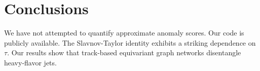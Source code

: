 \section{Conclusions}\label{sec:conclusions}

We have not attempted to quantify approximate anomaly scores. Our code
is publicly available. The Slavnov-Taylor identity exhibits a striking
dependence on $\tau$. Our results show that track-based equivariant
graph networks disentangle heavy-flavor jets.

